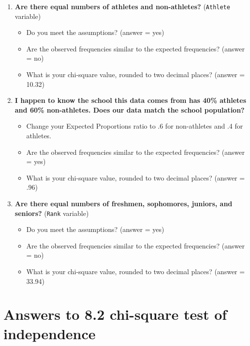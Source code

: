 \documentclass[
]{book}
\begin{document}
\begin{enumerate}
\def\labelenumi{\arabic{enumi}.}
\item
  \textbf{Are there equal numbers of athletes and non-athletes?} (\texttt{Athlete} variable)

  \begin{itemize}
  \item
    Do you meet the assumptions? (answer = yes)
  \item
    Are the observed frequencies similar to the expected frequencies? (answer = no)
  \item
    What is your chi-square value, rounded to two decimal places? (answer = 10.32)
  \end{itemize}
\item
  \textbf{I happen to know the school this data comes from has 40\% athletes and 60\% non-athletes. Does our data match the school population?}

  \begin{itemize}
  \item
    Change your Expected Proportions ratio to .6 for non-athletes and .4 for athletes.
  \item
    Are the observed frequencies similar to the expected frequencies? (answer = yes)
  \item
    What is your chi-square value, rounded to two decimal places? (answer = .96)
  \end{itemize}
\item
  \textbf{Are there equal numbers of freshmen, sophomores, juniors, and seniors?} (\texttt{Rank} variable)

  \begin{itemize}
  \item
    Do you meet the assumptions? (answer = yes)
  \item
    Are the observed frequencies similar to the expected frequencies? (answer = no)
  \item
    What is your chi-square value, rounded to two decimal places? (answer = 33.94)
  \end{itemize}
\end{enumerate}

\hypertarget{answers-to-8.2-chi-square-test-of-independence}{%
\section{Answers to 8.2 chi-square test of independence}\label{answers-to-8.2-chi-square-test-of-independence}}
\end{document}
